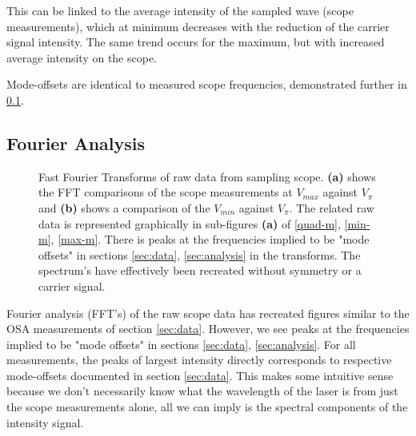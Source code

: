 \documentclass[12pt,a4paper]{report}
\begin{document}
This can be linked to the average intensity of the sampled wave (scope measurements), which at minimum decreases with the reduction of the carrier signal intensity. The same trend occurs for the maximum, but with increased average intensity on the scope. 

Mode-offsets are identical to measured scope frequencies, demonstrated further in \ref{four}.

\subsection{Fourier Analysis}\label{four}
\begin{figure}
    \centering
    \quad
    \caption{Fast Fourier Transforms of raw data from sampling scope. \textbf{(a)} shows the FFT comparisons of the scope measurements at $V_{max}$ against $V_{\pi}$ and \textbf{(b)} shows a comparison of the $V_{min}$ against $V_{\pi}$. The related raw data is represented graphically in sub-figures \textbf{(a)} of \ref{quad-m}, \ref{min-m}, \ref{max-m}. There is peaks at the frequencies implied to be "mode offsets" in sections \ref{sec:data}, \ref{sec:analysis} in the transforms. The spectrum's have effectively been recreated without symmetry or a carrier signal.}
    \label{OSA-current}
    \vspace{-12pt}
\end{figure}
Fourier analysis (FFT's) of the raw scope data has recreated figures similar to the OSA measurements of section \ref{sec:data}. However, we see peaks at the frequencies implied to be "mode offsets" in sections \ref{sec:data}, \ref{sec:analysis}. For all measurements, the peaks of largest intensity directly corresponds to respective mode-offsets documented in section \ref{sec:data}. This makes some intuitive sense because we don't necessarily know what the wavelength of the laser is from just the scope measurements alone, all we can imply is the spectral components of the intensity signal.
\end{document}
